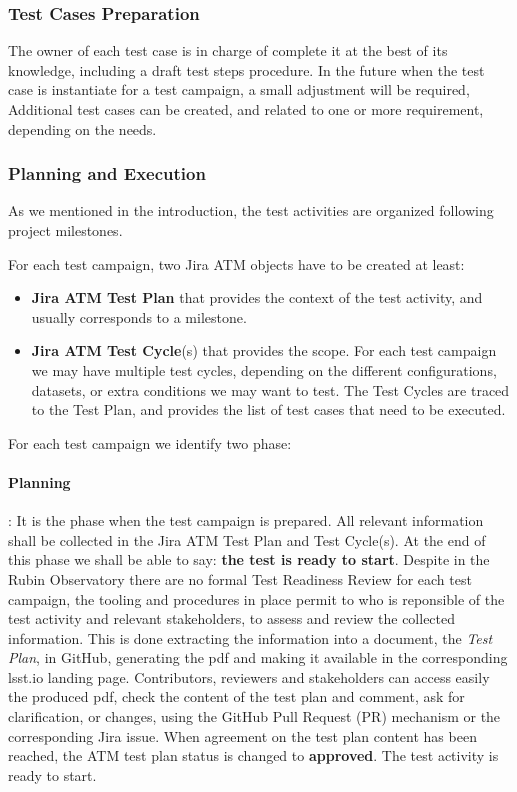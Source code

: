 \subsubsection{Test Cases Preparation}

The owner of each test case is in charge of complete it at the best of its knowledge, including a draft test steps procedure.
In the future when the test case is instantiate for a test campaign, a small adjustment will be required,
Additional test cases can be created, and related to one or more requirement, depending on the needs.

\subsubsection{Planning and Execution}

As we mentioned in the introduction, the test activities are organized following project milestones.

For each test campaign, two Jira ATM objects have to be created at least:

\begin{itemize}
\item \textbf{Jira ATM Test Plan} that provides the context of the test activity, and usually corresponds to a milestone.
\item \textbf{Jira ATM Test Cycle}(s) that provides the scope. For each test campaign we may have multiple test cycles, 
depending on the different configurations, datasets, or extra conditions we may want to test. The Test Cycles are traced
to the Test Plan, and provides the list of test cases that need to be executed.
\end{itemize}

For each test campaign we identify two phase:

\paragraph{Planning}:
It is the phase when the test campaign is prepared. All relevant information shall be collected in the Jira ATM Test Plan and 
Test Cycle(s). 
At the end of this phase we shall be able to say: \textbf{the test is ready to start}.
Despite in the Rubin Observatory there are no formal Test Readiness Review for each test campaign, 
the tooling and procedures in place permit to who is reponsible of the test activity and relevant stakeholders, to assess and review the collected information. 
This is done extracting the information into a document, the \textit{Test Plan}, in GitHub, generating the pdf and making it available
in the corresponding lsst.io landing page. Contributors, reviewers and stakeholders can access easily the produced pdf,
check the content of the test plan and comment, ask for clarification, or changes, using the GitHub
Pull Request (PR) mechanism or the corresponding Jira issue.
When agreement on the test plan content has been reached, the ATM test plan status is changed to \textbf{approved}. The test activity is ready to start.

